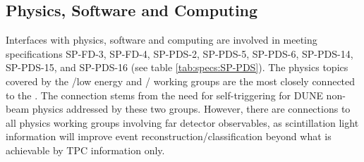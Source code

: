 \subsection{Physics, Software and Computing}


Interfaces with physics, software and computing are involved in meeting specifications SP-FD-3, SP-FD-4, SP-PDS-2, SP-PDS-5, SP-PDS-6, SP-PDS-14, SP-PDS-15, and SP-PDS-16 (see table \ref{tab:specs:SP-PDS}). The physics topics covered by the %
/low energy and / working groups are the most closely connected to the \single {}. The connection stems from the need for self-triggering for DUNE non-beam physics addressed by these two groups. 
However, there are connections to all physics working groups involving far detector observables, as scintillation light information will improve event reconstruction/classification beyond what is achievable by TPC information only. 




